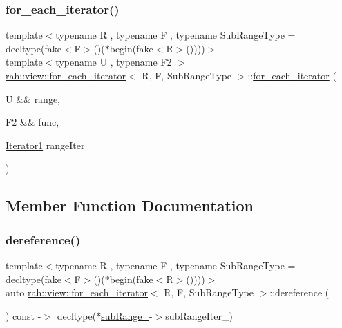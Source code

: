 \subsubsection{\texorpdfstring{for\_each\_iterator()}{for\_each\_iterator()}\hspace{0.1cm}{\footnotesize\ttfamily [2/2]}}
{\footnotesize\ttfamily template$<$typename R , typename F , typename Sub\+Range\+Type  = decltype(fake$<$\+F$>$()($\ast$begin(fake$<$\+R$>$())))$>$ \\
template$<$typename U , typename F2 $>$ \\
\mbox{\hyperlink{structrah_1_1view_1_1for__each__iterator}{rah\+::view\+::for\+\_\+each\+\_\+iterator}}$<$ R, F, Sub\+Range\+Type $>$\+::\mbox{\hyperlink{structrah_1_1view_1_1for__each__iterator}{for\+\_\+each\+\_\+iterator}} (\begin{DoxyParamCaption}\item[{U \&\&}]{range,  }\item[{F2 \&\&}]{func,  }\item[{\mbox{\hyperlink{structrah_1_1view_1_1for__each__iterator_a173ab775f95bdff3b3756714690be546}{Iterator1}}}]{range\+Iter }\end{DoxyParamCaption})\hspace{0.3cm}{\ttfamily [inline]}}



\subsection{Member Function Documentation}
\mbox{\label{structrah_1_1view_1_1for__each__iterator_a9204ed8495c7cb031758e53e4b451f4f}} 
\subsubsection{\texorpdfstring{dereference()}{dereference()}}
{\footnotesize\ttfamily template$<$typename R , typename F , typename Sub\+Range\+Type  = decltype(fake$<$\+F$>$()($\ast$begin(fake$<$\+R$>$())))$>$ \\
auto \mbox{\hyperlink{structrah_1_1view_1_1for__each__iterator}{rah\+::view\+::for\+\_\+each\+\_\+iterator}}$<$ R, F, Sub\+Range\+Type $>$\+::dereference (\begin{DoxyParamCaption}{ }\end{DoxyParamCaption}) const -\/$>$ decltype($\ast$\mbox{\hyperlink{structrah_1_1view_1_1for__each__iterator_a51f880dad745bc5fc0f5de78353ceb90}{sub\+Range\+\_\+}}-\/$>$sub\+Range\+Iter\+\_\+) \hspace{0.3cm}{\ttfamily [inline]}}

